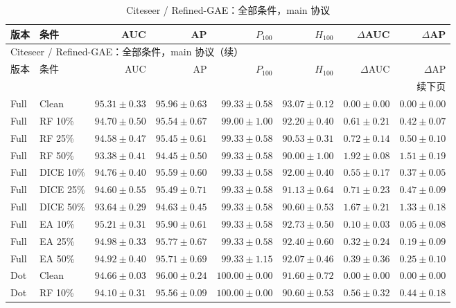 {\footnotesize
\setlength{\tabcolsep}{3.2pt}
\renewcommand{\arraystretch}{1.10}
\begin{longtable}{llrrrrrr}
\caption{Citeseer / Refined-GAE：全部条件，main 协议}\\
\toprule
版本 & 条件 & AUC & AP & $P_{100}$ & $H_{100}$ & $\Delta$AUC & $\Delta$AP \\
\midrule
\endfirsthead
\multicolumn{8}{l}{Citeseer / Refined-GAE：全部条件，main 协议（续）}\\
\toprule
版本 & 条件 & AUC & AP & $P_{100}$ & $H_{100}$ & $\Delta$AUC & $\Delta$AP \\
\midrule
\endhead
\midrule\multicolumn{8}{r}{续下页}\\
\endfoot
\bottomrule
\endlastfoot
Full & Clean & $95.31\pm0.33$ & $95.96\pm0.63$ & $99.33\pm0.58$ & $93.07\pm0.12$ & $0.00\pm0.00$ & $0.00\pm0.00$ \\
Full & RF 10\% & $94.70\pm0.50$ & $95.54\pm0.67$ & $99.00\pm1.00$ & $92.20\pm0.40$ & $0.61\pm0.21$ & $0.42\pm0.07$ \\
Full & RF 25\% & $94.58\pm0.47$ & $95.45\pm0.61$ & $99.33\pm0.58$ & $90.53\pm0.31$ & $0.72\pm0.14$ & $0.50\pm0.10$ \\
Full & RF 50\% & $93.38\pm0.41$ & $94.45\pm0.50$ & $99.33\pm0.58$ & $90.00\pm1.00$ & $1.92\pm0.08$ & $1.51\pm0.19$ \\
Full & DICE 10\% & $94.76\pm0.40$ & $95.59\pm0.60$ & $99.33\pm0.58$ & $92.00\pm0.40$ & $0.55\pm0.17$ & $0.37\pm0.05$ \\
Full & DICE 25\% & $94.60\pm0.55$ & $95.49\pm0.71$ & $99.33\pm0.58$ & $91.13\pm0.64$ & $0.71\pm0.23$ & $0.47\pm0.09$ \\
Full & DICE 50\% & $93.64\pm0.29$ & $94.63\pm0.45$ & $99.33\pm0.58$ & $90.60\pm0.53$ & $1.67\pm0.21$ & $1.33\pm0.18$ \\
Full & EA 10\% & $95.21\pm0.31$ & $95.90\pm0.61$ & $99.33\pm0.58$ & $92.73\pm0.50$ & $0.10\pm0.03$ & $0.05\pm0.08$ \\
Full & EA 25\% & $94.98\pm0.33$ & $95.77\pm0.67$ & $99.33\pm0.58$ & $92.40\pm0.60$ & $0.32\pm0.24$ & $0.19\pm0.09$ \\
Full & EA 50\% & $94.92\pm0.40$ & $95.71\pm0.69$ & $99.33\pm1.15$ & $92.07\pm0.46$ & $0.39\pm0.36$ & $0.25\pm0.10$ \\
Dot & Clean & $94.66\pm0.03$ & $96.00\pm0.24$ & $100.00\pm0.00$ & $91.60\pm0.72$ & $0.00\pm0.00$ & $0.00\pm0.00$ \\
Dot & RF 10\% & $94.10\pm0.31$ & $95.56\pm0.09$ & $100.00\pm0.00$ & $90.60\pm0.53$ & $0.56\pm0.32$ & $0.44\pm0.18$ \\

\end{longtable}}
